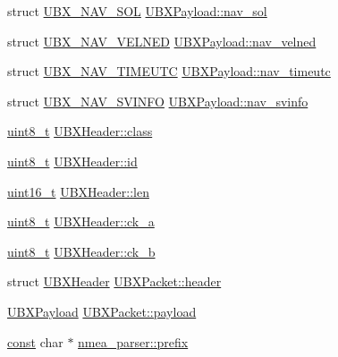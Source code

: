 \begin{DoxyCompactItemize}
struct \hyperlink{struct_u_b_x___n_a_v___s_o_l}{U\-B\-X\-\_\-\-N\-A\-V\-\_\-\-S\-O\-L} \hyperlink{group___g_s_p_module_gaba19134cfa2bf927f5ae568a4d1fa82f}{U\-B\-X\-Payload\-::nav\-\_\-sol}
\item 
struct \hyperlink{struct_u_b_x___n_a_v___v_e_l_n_e_d}{U\-B\-X\-\_\-\-N\-A\-V\-\_\-\-V\-E\-L\-N\-E\-D} \hyperlink{group___g_s_p_module_gae525d323fa4053d1f5441bae99d81a95}{U\-B\-X\-Payload\-::nav\-\_\-velned}
\item 
struct \hyperlink{struct_u_b_x___n_a_v___t_i_m_e_u_t_c}{U\-B\-X\-\_\-\-N\-A\-V\-\_\-\-T\-I\-M\-E\-U\-T\-C} \hyperlink{group___g_s_p_module_gaf65229991956493628326aa718c2e156}{U\-B\-X\-Payload\-::nav\-\_\-timeutc}
\item 
struct \hyperlink{struct_u_b_x___n_a_v___s_v_i_n_f_o}{U\-B\-X\-\_\-\-N\-A\-V\-\_\-\-S\-V\-I\-N\-F\-O} \hyperlink{group___g_s_p_module_gae82725b3f4df8d06429de80876bd7bb4}{U\-B\-X\-Payload\-::nav\-\_\-svinfo}
\item 
\hyperlink{stdint_8h_aba7bc1797add20fe3efdf37ced1182c5}{uint8\-\_\-t} \hyperlink{group___g_s_p_module_gab7410b764b3d80030e5a8e5167831303}{U\-B\-X\-Header\-::class}
\item 
\hyperlink{stdint_8h_aba7bc1797add20fe3efdf37ced1182c5}{uint8\-\_\-t} \hyperlink{group___g_s_p_module_gae65b35dcbe44c08985ab3ba9e1e04793}{U\-B\-X\-Header\-::id}
\item 
\hyperlink{stdint_8h_a273cf69d639a59973b6019625df33e30}{uint16\-\_\-t} \hyperlink{group___g_s_p_module_gac3357d02e8f968e15c24c81716054a85}{U\-B\-X\-Header\-::len}
\item 
\hyperlink{stdint_8h_aba7bc1797add20fe3efdf37ced1182c5}{uint8\-\_\-t} \hyperlink{group___g_s_p_module_ga151b080d3305855bcf4fb0c8042d6b7e}{U\-B\-X\-Header\-::ck\-\_\-a}
\item 
\hyperlink{stdint_8h_aba7bc1797add20fe3efdf37ced1182c5}{uint8\-\_\-t} \hyperlink{group___g_s_p_module_ga5fe662d32012b4caaca9b027df4a3d30}{U\-B\-X\-Header\-::ck\-\_\-b}
\item 
struct \hyperlink{struct_u_b_x_header}{U\-B\-X\-Header} \hyperlink{group___g_s_p_module_gaa1e79029fc57ab8ba520dfaf0c66f660}{U\-B\-X\-Packet\-::header}
\item 
\hyperlink{union_u_b_x_payload}{U\-B\-X\-Payload} \hyperlink{group___g_s_p_module_ga863aa6b84efd85ac358894c6cdfc6883}{U\-B\-X\-Packet\-::payload}
\item 
\hyperlink{group___n_a_m_e_ga7ae6d0e43244213b34de2c2b9aa30da6}{const} char $\ast$ \hyperlink{group___g_s_p_module_gaeb7052e0f799ff05ca599e5768f5b09f}{nmea\-\_\-parser\-::prefix}

\end{DoxyCompactItemize}
